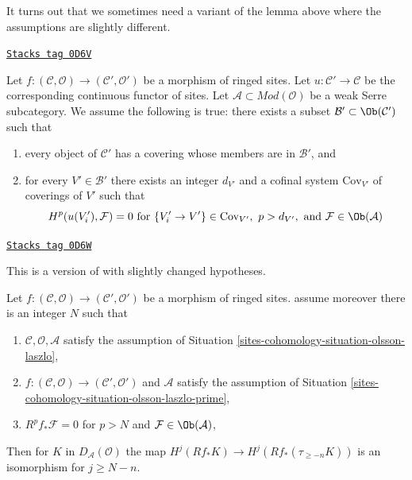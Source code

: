 It turns out that we sometimes need a variant of the lemma above
where the assumptions are slightly different.

\begin{definition}
\label{sites-cohomology-situation-olsson-laszlo-prime}
\href{https://stacks.math.columbia.edu/tag/0D6V}{\texttt{Stacks tag 0D6V}}

Let
$f : (\mathcal{C}, \mathcal{O}) \to (\mathcal{C}', \mathcal{O}')$
be a morphism of ringed sites. Let $u : \mathcal{C}' \to \mathcal{C}$
be the corresponding continuous functor of sites.
Let $\mathcal{A} \subset \textit{Mod}(\mathcal{O})$
be a weak Serre subcategory. We assume the following is true:
there exists a subset $\mathcal{B}' \subset \Ob(\mathcal{C}')$ such that
\begin{enumerate}
\item every object of $\mathcal{C}'$ has a covering whose
members are in $\mathcal{B}'$, and
\item for every $V' \in \mathcal{B}'$ there exists an integer $d_{V'}$
and a cofinal system $\text{Cov}_{V'}$ of coverings of $V'$ such
that
$$
H^p(u(V'_i), \mathcal{F}) = 0 \text{ for }
\{V'_i \to V'\} \in \text{Cov}_{V'},\ p > d_{V'}, \text{ and }
\mathcal{F} \in \Ob(\mathcal{A})
$$
\end{enumerate}
\end{definition}

\begin{lemma}
\label{sites-cohomology-lemma-olsson-laszlo-map-version-two}
\href{https://stacks.math.columbia.edu/tag/0D6W}{\texttt{Stacks tag 0D6W}}

\begin{reference}
This is a version of \cite[Lemma 2.1.10]{six-I} with slightly changed
hypotheses.
\end{reference}
Let $f : (\mathcal{C}, \mathcal{O}) \to (\mathcal{C}', \mathcal{O}')$
be a morphism of ringed sites.
assume moreover there is an integer $N$ such that
\begin{enumerate}
\item $\mathcal{C}, \mathcal{O}, \mathcal{A}$ satisfy the
assumption of Situation \ref{sites-cohomology-situation-olsson-laszlo},
\item $f : (\mathcal{C}, \mathcal{O}) \to (\mathcal{C}', \mathcal{O}')$
and $\mathcal{A}$ satisfy the assumption of
Situation \ref{sites-cohomology-situation-olsson-laszlo-prime},
\item $R^pf_*\mathcal{F} = 0$ for
$p > N$ and $\mathcal{F} \in \Ob(\mathcal{A})$,
\end{enumerate}
Then for $K$ in $D_\mathcal{A}(\mathcal{O})$ the map
$H^j(Rf_*K) \to H^j(Rf_*(\tau_{\geq -n}K))$ is an isomorphism
for $j \geq N - n$.
\end{lemma}

